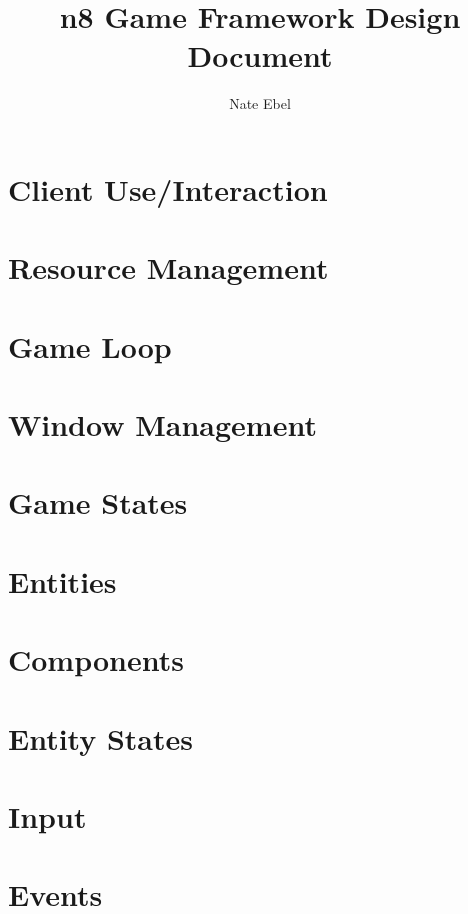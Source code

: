\documentclass[12pt]{article}
\begin{document}
\title{n8 Game Framework Design Document}
\author{Nate Ebel}

\maketitle

\tableofcontents
\pagebreak

\section{	Client Use/Interaction}


\section{ Resource Management}

\section{ Game Loop}
		
\section{Window Management}
	
\section{	Game States}

\section{	Entities}

\section{	Components}

\section{	Entity States}

\section{	Input}

\section{	Events}
\end{document}
